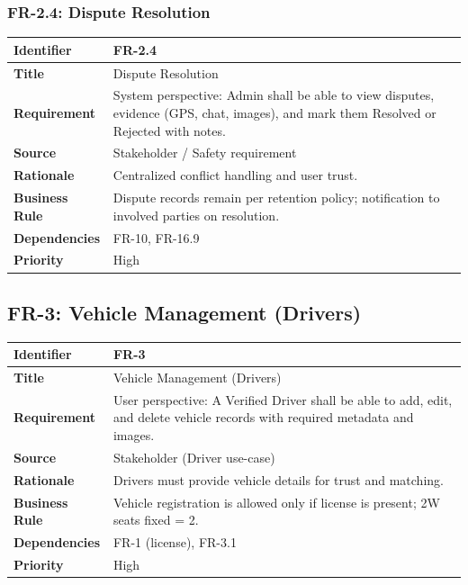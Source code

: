 \subsubsection{FR-2.4: Dispute Resolution}

\begin{longtable}{|p{3cm}|p{12cm}|}
\hline
\rowcolor{lightgray!30}
\textbf{Identifier} & FR-2.4 \\
\hline
\textbf{Title} & Dispute Resolution \\
\hline
\textbf{Requirement} & System perspective: Admin shall be able to view disputes, evidence (GPS, chat, images), and mark them Resolved or Rejected with notes. \\
\hline
\textbf{Source} & Stakeholder / Safety requirement \\
\hline
\textbf{Rationale} & Centralized conflict handling and user trust. \\
\hline
\textbf{Business Rule} & Dispute records remain per retention policy; notification to involved parties on resolution. \\
\hline
\textbf{Dependencies} & FR-10, FR-16.9 \\
\hline
\textbf{Priority} & High \\
\hline
\end{longtable}

\subsection{FR-3: Vehicle Management (Drivers)}

\begin{longtable}{|p{3cm}|p{12cm}|}
\hline
\rowcolor{lightgray!30}
\textbf{Identifier} & FR-3 \\
\hline
\textbf{Title} & Vehicle Management (Drivers) \\
\hline
\textbf{Requirement} & User perspective: A Verified Driver shall be able to add, edit, and delete vehicle records with required metadata and images. \\
\hline
\textbf{Source} & Stakeholder (Driver use-case) \\
\hline
\textbf{Rationale} & Drivers must provide vehicle details for trust and matching. \\
\hline
\textbf{Business Rule} & Vehicle registration is allowed only if license is present; 2W seats fixed = 2. \\
\hline
\textbf{Dependencies} & FR-1 (license), FR-3.1 \\
\hline
\textbf{Priority} & High \\
\hline
\end{longtable}


